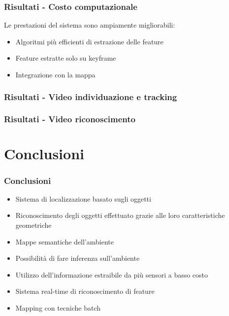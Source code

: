 \documentclass[c]{beamer}
\begin{document}

\begin{frame}
\frametitle{Risultati - Costo computazionale}
Le prestazioni del sistema sono ampiamente migliorabili:
\begin{itemize}
 \item Algoritmi più efficienti di estrazione delle feature
 \item Feature estratte solo su keyframe
 \item Integrazione con la mappa
\end{itemize}
 
\end{frame}


\begin{frame}
\frametitle{Risultati - Video individuazione e tracking}
 
\end{frame}


\begin{frame}
\frametitle{Risultati - Video riconoscimento}


\end{frame}


\section{Conclusioni}
\begin{frame}
\frametitle{Conclusioni}
\begin{itemize}
 \item Sistema di localizzazione basato sugli oggetti
 \item Riconoscimento degli oggetti effettuato grazie alle loro caratteristiche geometriche
 \item Mappe semantiche dell'ambiente
 \item Possibilità di fare inferenza sull'ambiente
 \item Utilizzo dell'informazione estraibile da più sensori a basso costo
 \item Sistema real-time di riconoscimento di feature
 \item Mapping con tecniche batch
\end{itemize}


\end{frame}
\end{document}
